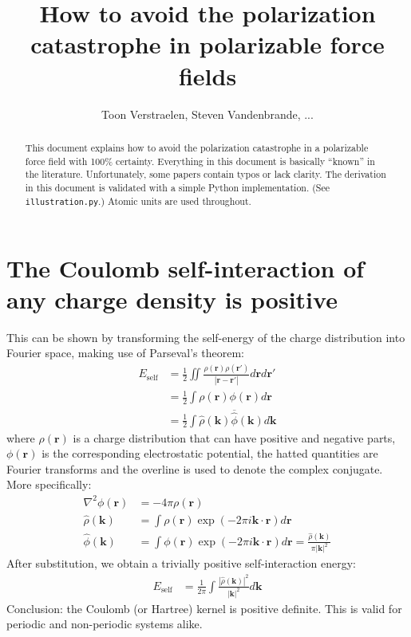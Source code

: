 \documentclass[a4paper,12pt,parskip=half]{scrartcl}
\title{How to avoid the polarization catastrophe in polarizable force fields}
\author{Toon Verstraelen, Steven Vandenbrande, ...}
\begin{document}
\maketitle

\begin{abstract}
This document explains how to avoid the polarization catastrophe in a polarizable force field with 100\% certainty. Everything in this document is basically ``known'' in the literature. Unfortunately, some papers contain typos or lack clarity. The derivation in this document is validated with a simple Python implementation. (See \texttt{illustration.py}.) Atomic units are used throughout.
\end{abstract}

\section{The Coulomb self-interaction of any charge density is positive}

This can be shown by transforming the self-energy of the charge distribution into Fourier space, making use of Parseval's theorem:
%
\begin{align}
    E_\text{self}
        &= \frac{1}{2} \iint \frac{ \rho(\mathbold{r}) \rho(\mathbold{r}') }{| \mathbold{r} - \mathbold{r}' |} d\mathbold{r} d\mathbold{r}' \\
        &= \frac{1}{2} \int \rho(\mathbold{r}) \phi(\mathbold{r}) d\mathbold{r} \\
        &= \frac{1}{2} \int \hat{\rho}(\mathbold{k}) \overline{\hat{\phi}}(\mathbold{k}) d\mathbold{k}
\end{align}
%
where $\rho(\mathbold{r})$ is a charge distribution that can have positive and negative parts, $\phi(\mathbold{r})$ is the corresponding electrostatic potential, the hatted quantities are Fourier transforms and the overline is used to denote the complex conjugate. More specifically:
%
\begin{align}
    \nabla^2 \phi(\mathbold{r}) &= -4\pi \rho(\mathbold{r}) \\
    \hat{\rho}(\mathbold{k}) &= \int \rho(\mathbold{r}) \exp(-2\pi i \mathbold{k} \cdot \mathbold{r}) d\mathbold{r} \\
    \hat{\phi}(\mathbold{k}) &= \int \phi(\mathbold{r}) \exp(-2\pi i \mathbold{k} \cdot \mathbold{r}) d\mathbold{r} = \frac{\hat{\rho}(\mathbold{k})}{\pi |\mathbold{k}|^2}
\end{align}
%
After substitution, we obtain a trivially positive self-interaction energy:
%
\begin{align}
    E_\text{self} &= \frac{1}{2\pi} \int \frac{ |\hat{\rho}(\mathbold{k})|^2 }{|\mathbold{k}|^2} d\mathbold{k}
\end{align}
%
Conclusion: the Coulomb (or Hartree) kernel is positive definite. This is valid for periodic and non-periodic systems alike.
\end{document}

